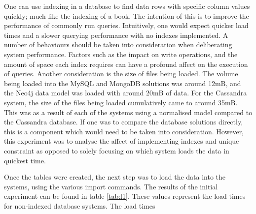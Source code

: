One can use indexing in a database to find data rows with specific column values quickly; much like the indexing of a book. The intention of this is to improve the performance of commonly run queries. Intuitively, one would expect quicker load times and a slower querying performance with no indexes implemented. A number of behaviours should be taken into consideration when deliberating system performance. Factors such as the impact on write operations, and the amount of space each index requires can have a profound affect on the execution of queries. Another consideration is the size of files being loaded. The volume being loaded into the MySQL and MongoDB solutions was around 12mB, and the Neo4j data model was loaded with around 20mB of data. For the Cassandra system, the size of the files being loaded cumulatively came to around 35mB. This was as a result of each of the systems using a normalised model compared to the Cassandra database. If one was to compare the database solutions directly, this is a component which would need to be taken into consideration. However, this experiment was to analyse the affect of implementing indexes and unique constraint as opposed to solely focusing on which system loads the data in quickest time.

Once the tables were created, the next step was to load the data into the systems, using the various import commands. The results of the initial experiment can be found in table \ref{tab:l1}. These values represent the load times for non-indexed database systems. The load times 

